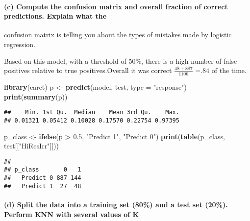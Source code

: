\documentclass[]{article}
\newenvironment{Shaded}{\begin{snugshade}}{\end{snugshade}}
\newcommand{\DataTypeTok}[1]{\textcolor[rgb]{0.13,0.29,0.53}{#1}}
\newcommand{\FloatTok}[1]{\textcolor[rgb]{0.00,0.00,0.81}{#1}}
\newcommand{\KeywordTok}[1]{\textcolor[rgb]{0.13,0.29,0.53}{\textbf{#1}}}
\newcommand{\NormalTok}[1]{#1}
\newcommand{\OperatorTok}[1]{\textcolor[rgb]{0.81,0.36,0.00}{\textbf{#1}}}
\newcommand{\StringTok}[1]{\textcolor[rgb]{0.31,0.60,0.02}{#1}}
\let\oldparagraph\paragraph
\renewcommand{\paragraph}[1]{\oldparagraph{#1}\mbox{}}
\begin{document}
\hypertarget{c-compute-the-confusion-matrix-and-overall-fraction-of-correct-predictions.-explain-what-the}{%
\paragraph{(c) Compute the confusion matrix and overall fraction of
correct predictions. Explain what
the}\label{c-compute-the-confusion-matrix-and-overall-fraction-of-correct-predictions.-explain-what-the}}

confusion matrix is telling you about the types of mistakes made by
logistic regression.

Based on this model, with a threshold of 50\%, there is a high number of
false positives relative to true positives.Overall it was correct
\(\frac{48 + 887}{1106}\) =\(.84\) of the time.

\begin{Shaded}
\begin{Highlighting}[]
\KeywordTok{library}\NormalTok{(caret)}
\NormalTok{p <{-}}\StringTok{ }\KeywordTok{predict}\NormalTok{(model, test, }\DataTypeTok{type =} \StringTok{"response"}\NormalTok{)}
\KeywordTok{print}\NormalTok{(}\KeywordTok{summary}\NormalTok{(p))}
\end{Highlighting}
\end{Shaded}

\begin{verbatim}
##    Min. 1st Qu.  Median    Mean 3rd Qu.    Max. 
## 0.01321 0.05412 0.10028 0.17570 0.22754 0.97395
\end{verbatim}

\begin{Shaded}
\begin{Highlighting}[]
\NormalTok{p\_class <{-}}\StringTok{ }\KeywordTok{ifelse}\NormalTok{(p }\OperatorTok{>}\StringTok{ }\FloatTok{0.5}\NormalTok{, }\StringTok{"Predict 1"}\NormalTok{, }\StringTok{"Predict 0"}\NormalTok{)}
\KeywordTok{print}\NormalTok{(}\KeywordTok{table}\NormalTok{(p\_class, test[[}\StringTok{"HiResIrr"}\NormalTok{]]))}
\end{Highlighting}
\end{Shaded}

\begin{verbatim}
##            
## p_class       0   1
##   Predict 0 887 144
##   Predict 1  27  48
\end{verbatim}

\hypertarget{d-split-the-data-into-a-training-set-80-and-a-test-set-20.-perform-knn-with-several-values-of-k}{%
\paragraph{(d) Split the data into a training set (80\%) and a test set
(20\%). Perform KNN with several values of
K}\label{d-split-the-data-into-a-training-set-80-and-a-test-set-20.-perform-knn-with-several-values-of-k}}
\end{document}
